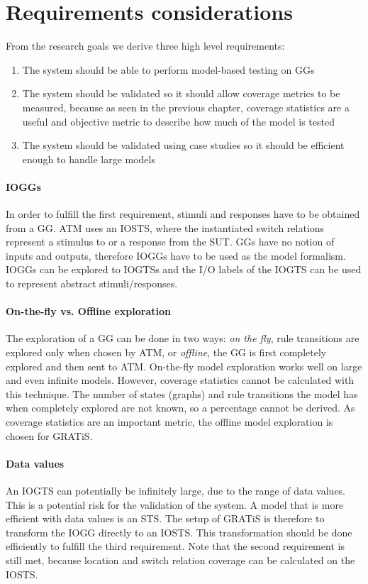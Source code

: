 \section{Requirements considerations}
From the research goals we derive three high level requirements:
\begin{enumerate}
\item The system should be able to perform model-based testing on GGs
\item The system should be validated so it should allow coverage metrics to be measured, because as seen in the previous chapter, coverage statistics are a useful and objective metric to describe how much of the model is tested
\item The system should be validated using case studies so it should be efficient enough to handle large models
\end{enumerate}

\paragraph*{IOGGs} In order to fulfill the first requirement, stimuli and responses have to be obtained from a GG. ATM uses an IOSTS, where the instantiated switch relations represent a stimulus to or a response from the SUT. GGs have no notion of inputs and outputs, therefore IOGGs have to be used as the model formalism. IOGGs can be explored to IOGTSs and the I/O labels of the IOGTS can be used to represent abstract stimuli/responses.

\paragraph*{On-the-fly vs. Offline exploration} The exploration of a GG can be done in two ways: \textit{on the fly}, rule transitions are explored only when chosen by ATM, or \textit{offline}, the GG is first completely explored and then sent to ATM. On-the-fly model exploration works well on large and even infinite models. However, coverage statistics cannot be calculated with this technique. The number of states (graphs) and rule transitions the model has when completely explored are not known, so a percentage cannot be derived. As coverage statistics are an important metric, the offline model exploration is chosen for GRATiS.

\paragraph*{Data values} An IOGTS can potentially be infinitely large, due to the range of data values. This is a potential risk for the validation of the system. A model that is more efficient with data values is an STS. The setup of GRATiS is therefore to transform the IOGG directly to an IOSTS. This transformation should be done efficiently to fulfill the third requirement. Note that the second requirement is still met, because location and switch relation coverage can be calculated on the IOSTS.

